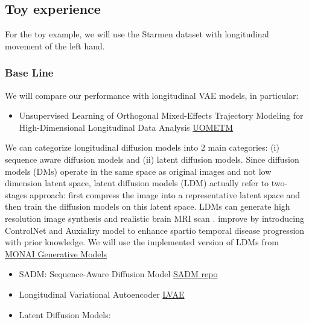 \subsection{Toy experience}

For the toy example, we will use the Starmen dataset with longitudinal movement of the left hand. 

\subsubsection{Base Line}

We will compare our performance with longitudinal VAE models, in particular: 

\begin{itemize}
    \item Unsupervised Learning of Orthogonal Mixed-Effects Trajectory Modeling for High-Dimensional Longitudinal Data Analysis \href{https://github.com/MChen808/UOMETM/tree/main}{UOMETM}
\end{itemize}

We can categorize longitudinal diffusion models into 2 main categories: (i) sequence aware diffusion models and (ii) latent diffusion models. Since diffusion models (DMs) operate in the same space as original images and not low dimension latent space, latent diffusion models (LDM) actually refer to two-stages approach: first compress the image into a representative latent space and then train the diffusion models on this latent space. LDMs can generate high resolution image synthesis \cite{rombachLDM} and realistic brain MRI scan \cite{pinayaLDM}. \cite{puglisiBrLP} improve by introducing ControlNet and Auxialiry model to enhance spartio temporal disease progression with prior knowledge. We will use the implemented version of LDMs from \href{https://github.com/Project-MONAI/GenerativeModels/tree/main}{MONAI Generative Models}

\begin{itemize}
    \item SADM: Sequence-Aware Diffusion Model \href{https://github.com/ubc-tea/SADM-Longitudinal-Medical-Image-Generation}{SADM repo}

    \item Longitudinal Variational Autoencoder \href{https://github.com/bsauty/longitudinal-VAEs}{LVAE}
    
    \item Latent Diffusion Models: 

\end{itemize}